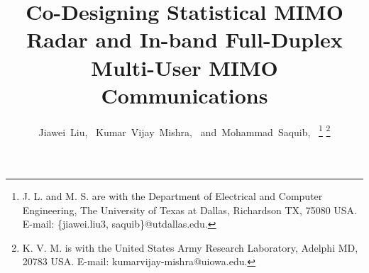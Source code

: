 \documentclass[10pt,journal]{IEEEtran}
\theoremstyle{definition}
\begin{document}
\setlength{\abovedisplayskip}{3pt}
\setlength{\belowdisplayskip}{3pt}
	\title{Co-Designing Statistical MIMO Radar and In-band Full-Duplex Multi-User MIMO Communications}
	\author{Jiawei~Liu,~
		Kumar~Vijay~Mishra,~
		and~Mohammad~Saquib,~
		\thanks{J. L. and M. S. are with the Department
			of Electrical and Computer Engineering, The University of Texas at Dallas, Richardson
			TX, 75080 USA. E-mail: \{jiawei.liu3, saquib\}@utdallas.edu.}%
		\thanks{K. V. M. is with the United States Army Research Laboratory, Adelphi MD, 20783 USA. E-mail: kumarvijay-mishra@uiowa.edu.}%
}
	
	
	
	
	
	
	
	
	
	
	
	
	\maketitle
	
\end{document}

